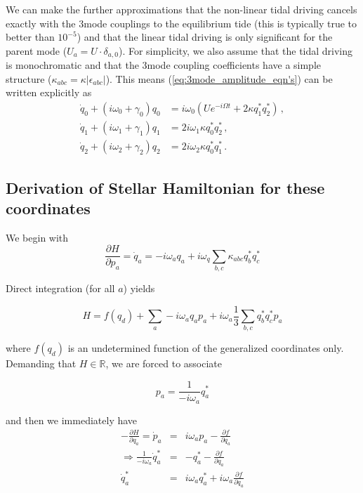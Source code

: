 We can make the further approximations that the non-linear tidal driving cancels exactly with the 3mode couplings to the equilibrium tide (this is typically true to better than $10^{-5}$) and that the linear tidal driving is only significant for the parent mode ($U_a = U\cdot\delta_{a,0}$). For simplicity, we also assume that the tidal driving is monochromatic and that the 3mode coupling coefficients have a simple structure ($\kappa_{abc} = \kappa |\epsilon_{abc}|$). This means (\ref{eq:3mode_amplitude_eqn's}) can be written explicitly as
\begin{subequations}\label{eq:simplified_3mode_amplitude_eqn's}
\begin{align}
\dot{q}_0 + (i\omega_0 + \gamma_0)q_0 & = i\omega_0 ( U e^{-i\Omega t} + 2 \kappa q_1^\ast q_2^\ast) \,,\\
\dot{q}_1 + (i\omega_1 + \gamma_1)q_1 & = 2 i\omega_1 \kappa q_0^\ast q_2^\ast \,,\\
\dot{q}_2 + (i\omega_2 + \gamma_2)q_2 & = 2 i\omega_2 \kappa q_0^\ast q_1^\ast \,.
\end{align}
\end{subequations}

\subsection*{Derivation of Stellar Hamiltonian for these coordinates}

We begin with 
\begin{equation}
\frac{\partial H}{\partial p_a} = \dot{q}_a = -i\omega_a q_a + i\omega_q \sum_{b,c} \kappa_{abc} q_b^\ast q_c^\ast
\end{equation}

Direct integration (for all $a$) yields

\begin{equation}
H = f(q_d) + \sum_{a} -i\omega_a q_a p_a +i\omega_a \frac{1}{3}\sum_{b,c} q_b^\ast q_c^\ast p_a
\end{equation}

where $f(q_d)$ is an undetermined function of the generalized coordinates only. Demanding that $H\in\mathbb{R}$, we are forced to associate 

\begin{equation}
p_a = \frac{1}{-i\omega_a} q_a^\ast
\end{equation}

and then we immediately have
\begin{eqnarray}
-\frac{\partial H}{\partial q_a} = \dot{p}_a & = & i\omega_a p_a - \frac{\partial f}{\partial q_a} \\
\Rightarrow  \frac{1}{-i\omega_a} \dot{q}_a^\ast & = & -q_a^\ast - \frac{\partial f}{\partial q_a} \\              
                                  \dot{q}_a^\ast & = & i\omega_a q_a^\ast + i\omega_a \frac{\partial f}{\partial q_a} \\
\end{eqnarray}

